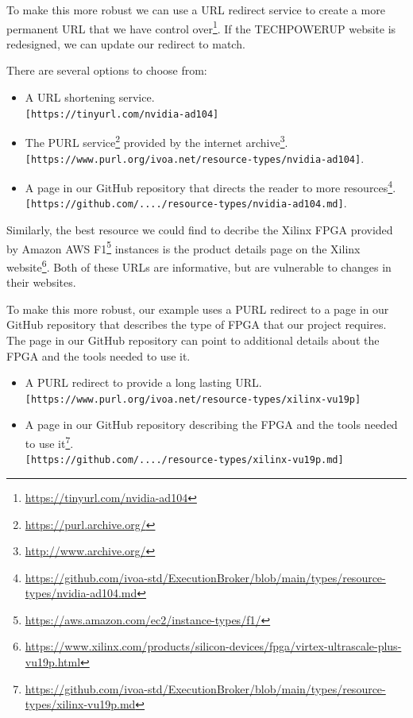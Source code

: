 \documentclass[11pt,a4paper]{ivoa}
\newcommand{\codeword}[1] {\texttt{#1}}
\newcommand{\footurl}[1] {\footnote{\url{#1}}}
\begin{document}
To make this more robust we can use a URL redirect service to create a more permanent
URL that we have control over\footurl{https://tinyurl.com/nvidia-ad104}.
If the TECHPOWERUP website is redesigned, we can update
our redirect to match.

There are several options to choose from:
\begin{itemize}
\item A URL shortening service.\\
      \codeword{[https://tinyurl.com/nvidia-ad104]}
\item The PURL service\footurl{https://purl.archive.org/} provided by the internet archive\footurl{http://www.archive.org/}.\\
      \codeword{[https://www.purl.org/ivoa.net/resource-types/nvidia-ad104]}.
\item A page in our GitHub repository that directs the reader to more resources\footurl{https://github.com/ivoa-std/ExecutionBroker/blob/main/types/resource-types/nvidia-ad104.md}.\\
      \codeword{[https://github.com/..../resource-types/nvidia-ad104.md]}.
\end{itemize}

Similarly, the best resource we could find to decribe the Xilinx FPGA provided by Amazon AWS
F1\footurl{https://aws.amazon.com/ec2/instance-types/f1/} instances is the product details
page on the Xilinx website\footurl{https://www.xilinx.com/products/silicon-devices/fpga/virtex-ultrascale-plus-vu19p.html}.
Both of these URLs are informative, but are vulnerable to changes in their websites.

To make this more robust, our example uses a PURL redirect to a page in our GitHub repository that describes
the type of FPGA that our project requires. The page in our GitHub repository can point to additional details about the
FPGA and the tools needed to use it.
\begin{itemize}
\item A PURL redirect to provide a long lasting URL.\\
      \codeword{[https://www.purl.org/ivoa.net/resource-types/xilinx-vu19p]}
\item A page in our GitHub repository describing the FPGA and the tools needed to use it\footurl{https://github.com/ivoa-std/ExecutionBroker/blob/main/types/resource-types/xilinx-vu19p.md}.\\
      \codeword{[https://github.com/..../resource-types/xilinx-vu19p.md]}
\end{itemize}
\end{document}

